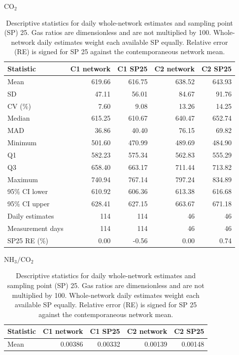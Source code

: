 \begin{table}
\centering
\scriptsize
\caption{Descriptive statistics for daily whole-network estimates and sampling point (SP) 25. Gas ratios are dimensionless and are not multiplied by 100. Whole-network daily estimates weight each available SP equally. Relative error (RE) is signed for SP 25 against the contemporaneous network mean.}
\label{tab:full_descriptive_statistics}
\setlength{\tabcolsep}{3.2pt}
\begin{minipage}[t]{0.48\textwidth}\centering\textbf{$\mathrm{CO_2}$}\par\vspace{1mm}
\begin{tabular}{lrrrr}
\toprule
Statistic & C1 network & C1 SP25 & C2 network & C2 SP25\\
\midrule
Mean & 619.66 & 616.75 & 638.52 & 643.93
\\
SD & 47.11 & 56.01 & 84.67 & 91.76
\\
CV (\%) & 7.60 & 9.08 & 13.26 & 14.25
\\
Median & 615.25 & 610.67 & 640.47 & 652.74
\\
MAD & 36.86 & 40.40 & 76.15 & 69.82
\\
Minimum & 501.60 & 470.99 & 489.69 & 484.90
\\
Q1 & 582.23 & 575.34 & 562.83 & 555.29
\\
Q3 & 658.40 & 663.17 & 711.44 & 713.82
\\
Maximum & 740.94 & 767.14 & 797.24 & 834.89
\\
95\% CI lower & 610.92 & 606.36 & 613.38 & 616.68
\\
95\% CI upper & 628.41 & 627.15 & 663.67 & 671.18
\\
Daily estimates & 114 & 114 & 46 & 46
\\
Measurement days & 114 & 114 & 46 & 46
\\
SP25 RE (\%) & 0.00 & -0.56 & 0.00 & 0.74
\\
\bottomrule
\end{tabular}
\end{minipage}
\hfill
\begin{minipage}[t]{0.48\textwidth}\centering\textbf{$\mathrm{NH_3}/\mathrm{CO_2}$}\par\vspace{1mm}
\begin{tabular}{lrrrr}
\toprule
Statistic & C1 network & C1 SP25 & C2 network & C2 SP25\\
\midrule
Mean & 0.00386 & 0.00332 & 0.00139 & 0.00148
\\

\end{tabular}
\end{minipage}
\end{table}
